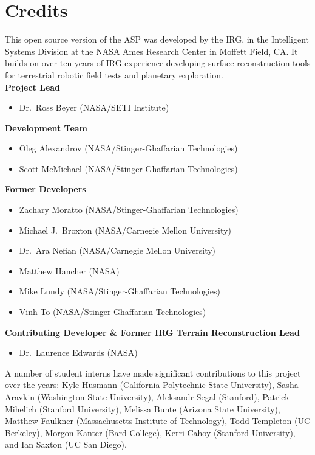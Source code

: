 \chapter*{Credits}

This open source version of the \ac{ASP} was developed by the
\ac{IRG}, in the Intelligent Systems Division at the \ac{NASA} Ames
Research Center in Moffett Field, CA. It builds on over ten years
of IRG experience developing surface reconstruction tools for
terrestrial robotic field tests and planetary exploration. \\

{\bf Project Lead}
\begin {itemize}
\item Dr.~Ross Beyer (NASA/SETI Institute)
\end{itemize}

{\bf Development Team}
\begin{itemize}
\item Oleg Alexandrov (NASA/Stinger-Ghaffarian Technologies)
\item Scott McMichael (NASA/Stinger-Ghaffarian Technologies)
\end{itemize}

{\bf Former Developers}
\begin{itemize}
\item Zachary Moratto (NASA/Stinger-Ghaffarian Technologies)
\item Michael J.~Broxton (NASA/Carnegie Mellon University)
\item Dr.~Ara Nefian (NASA/Carnegie Mellon University)
\item Matthew Hancher (NASA)
\item Mike Lundy (NASA/Stinger-Ghaffarian Technologies)
\item Vinh To (NASA/Stinger-Ghaffarian Technologies)
\end{itemize}

{\bf Contributing Developer \& Former IRG Terrain Reconstruction Lead}
\begin{itemize}
\item Dr.~Laurence Edwards (NASA)
\end{itemize}

A number of student interns have made significant contributions to
this project over the years: Kyle Husmann (California Polytechnic
State University), Sasha Aravkin (Washington State University),
Aleksandr Segal (Stanford), Patrick Mihelich (Stanford University),
Melissa Bunte (Arizona State University), Matthew Faulkner
(Massachusetts Institute of Technology), Todd Templeton (UC Berkeley),
Morgon Kanter (Bard College), Kerri Cahoy (Stanford University), and
Ian Saxton (UC San Diego).

